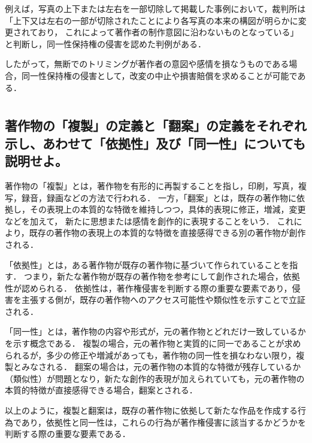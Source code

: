 \documentclass[titlepage,a4paper]{jsarticle}
\begin{document}
例えば，写真の上下または左右を一部切除して掲載した事例において，裁判所は「上下又は左右の一部が切除されたことにより各写真の本来の構図が明らかに変更されており，
これによって著作者の制作意図に沿わないものとなっている」と判断し，同一性保持権の侵害を認めた判例がある．\cite{task3_3}

したがって，無断でのトリミングが著作者の意図や感情を損なうものである場合，同一性保持権の侵害として，改変の中止や損害賠償を求めることが可能である．

\section{ }
\subsection{著作物の「複製」の定義と「翻案」の定義をそれぞれ示し、あわせて「依拠性」及び「同一性」についても説明せよ。}
著作物の「複製」とは，著作物を有形的に再製することを指し，印刷，写真，複写，録音，録画などの方法で行われる．
一方，「翻案」とは，既存の著作物に依拠し，その表現上の本質的な特徴を維持しつつ，具体的表現に修正，増減，変更などを加えて，
新たに思想または感情を創作的に表現することをいう．
これにより，既存の著作物の表現上の本質的な特徴を直接感得できる別の著作物が創作される．

「依拠性」とは，ある著作物が既存の著作物に基づいて作られていることを指す．
つまり，新たな著作物が既存の著作物を参考にして創作された場合，依拠性が認められる．
依拠性は，著作権侵害を判断する際の重要な要素であり，侵害を主張する側が，既存の著作物へのアクセス可能性や類似性を示すことで立証される．

「同一性」とは，著作物の内容や形式が，元の著作物とどれだけ一致しているかを示す概念である．
複製の場合，元の著作物と実質的に同一であることが求められるが，多少の修正や増減があっても，著作物の同一性を損なわない限り，複製とみなされる．
翻案の場合は，元の著作物の本質的な特徴が残存しているか（類似性）が問題となり，新たな創作的表現が加えられていても，元の著作物の本質的特徴が直接感得できる場合，翻案とされる．

以上のように，複製と翻案は，既存の著作物に依拠して新たな作品を作成する行為であり，依拠性と同一性は，これらの行為が著作権侵害に該当するかどうかを判断する際の重要な要素である．\cite{task4}
\end{document}
